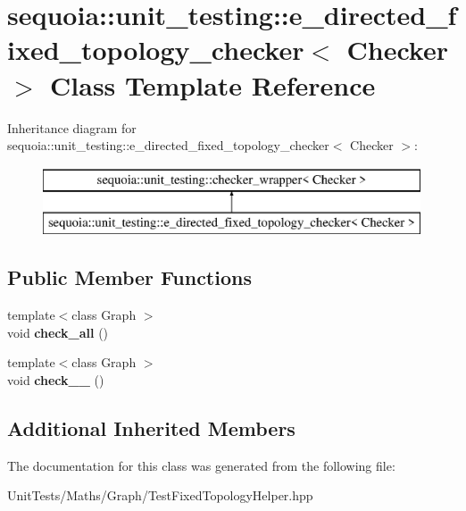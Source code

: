 \hypertarget{classsequoia_1_1unit__testing_1_1e__directed__fixed__topology__checker}{}\section{sequoia\+::unit\+\_\+testing\+::e\+\_\+directed\+\_\+fixed\+\_\+topology\+\_\+checker$<$ Checker $>$ Class Template Reference}
\label{classsequoia_1_1unit__testing_1_1e__directed__fixed__topology__checker}
Inheritance diagram for sequoia\+::unit\+\_\+testing\+::e\+\_\+directed\+\_\+fixed\+\_\+topology\+\_\+checker$<$ Checker $>$\+:\begin{figure}[H]
\begin{center}
\leavevmode
\includegraphics[height=2.000000cm]{classsequoia_1_1unit__testing_1_1e__directed__fixed__topology__checker}
\end{center}
\end{figure}
\subsection*{Public Member Functions}
\begin{DoxyCompactItemize}
\item 
\mbox{\label{classsequoia_1_1unit__testing_1_1e__directed__fixed__topology__checker_a559dbda82180b1175e8292960c3e061a}} 
{\footnotesize template$<$class Graph $>$ }\\void {\bfseries check\+\_\+all} ()
\item 
\mbox{\label{classsequoia_1_1unit__testing_1_1e__directed__fixed__topology__checker_aca09c85b95696fb213eff890eb9fa0e7}} 
{\footnotesize template$<$class Graph $>$ }\\void {\bfseries check\+\_\+\_} ()
\end{DoxyCompactItemize}
\subsection*{Additional Inherited Members}


The documentation for this class was generated from the following file\+:\begin{DoxyCompactItemize}
\item 
Unit\+Tests/\+Maths/\+Graph/Test\+Fixed\+Topology\+Helper.\+hpp\end{DoxyCompactItemize}
